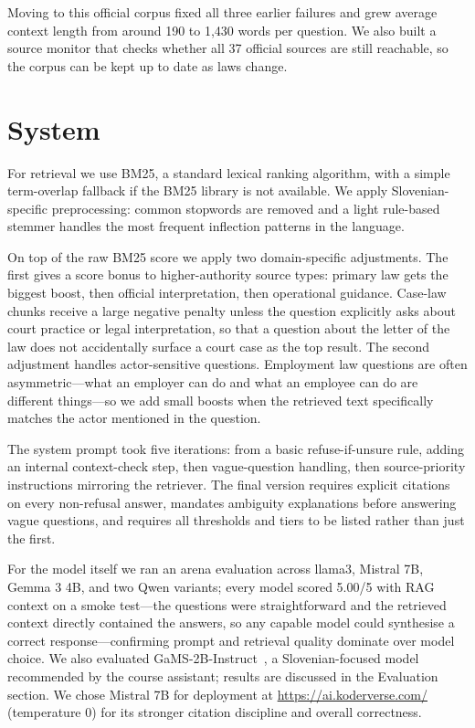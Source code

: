 \documentclass[fleqn,moreauthors,10pt]{ds_report}
\begin{document}
Moving to this official corpus fixed all three earlier failures and grew average context length from around 190 to 1,430 words per question.
We also built a source monitor that checks whether all 37 official sources are still reachable, so the corpus can be kept up to date as laws change.

\section*{System}

For retrieval we use BM25, a standard lexical ranking algorithm, with a simple term-overlap fallback if the BM25 library is not available.
We apply Slovenian-specific preprocessing: common stopwords are removed and a light rule-based stemmer handles the most frequent inflection patterns in the language.

On top of the raw BM25 score we apply two domain-specific adjustments.
The first gives a score bonus to higher-authority source types: primary law gets the biggest boost, then official interpretation, then operational guidance.
Case-law chunks receive a large negative penalty unless the question explicitly asks about court practice or legal interpretation, so that a question about the letter of the law does not accidentally surface a court case as the top result.
The second adjustment handles actor-sensitive questions.
Employment law questions are often asymmetric---what an employer can do and what an employee can do are different things---so we add small boosts when the retrieved text specifically matches the actor mentioned in the question.

The system prompt took five iterations: from a basic refuse-if-unsure rule, adding an internal context-check step, then vague-question handling, then source-priority instructions mirroring the retriever.
The final version requires explicit citations on every non-refusal answer, mandates ambiguity explanations before answering vague questions, and requires all thresholds and tiers to be listed rather than just the first.

For the model itself we ran an arena evaluation across llama3, Mistral 7B, Gemma 3 4B, and two Qwen variants; every model scored 5.00/5 with RAG context on a smoke test---the questions were straightforward and the retrieved context directly contained the answers, so any capable model could synthesise a correct response---confirming prompt and retrieval quality dominate over model choice.
We also evaluated GaMS-2B-Instruct~\cite{GaMS1B}, a Slovenian-focused model recommended by the course assistant; results are discussed in the Evaluation section.
We chose Mistral 7B for deployment at \url{https://ai.koderverse.com/} (temperature 0) for its stronger citation discipline and overall correctness.
\end{document}
